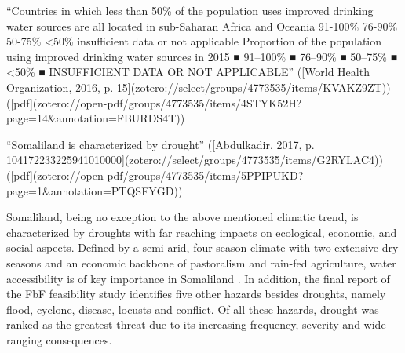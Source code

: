 “Countries in which less than 50\% of the population uses improved drinking water sources are all located in sub-Saharan Africa and Oceania 91-100\% 76-90\% 50-75\% <50\% insufficient data or not applicable Proportion of the population using improved drinking water sources in 2015 ■ 91–100\% ■ 76–90\% ■ 50–75\% ■ <50\% ■ INSUFFICIENT DATA OR NOT APPLICABLE” ([World Health Organization, 2016, p. 15](zotero://select/groups/4773535/items/KVAKZ9ZT)) ([pdf](zotero://open-pdf/groups/4773535/items/4STYK52H?page=14\&annotation=FBURDS4T))




“Somaliland is characterized by drought” ([Abdulkadir, 2017, p. 104172233225941010000](zotero://select/groups/4773535/items/G2RYLAC4)) ([pdf](zotero://open-pdf/groups/4773535/items/5PPIPUKD?page=1&annotation=PTQSFYGD))






Somaliland, being no exception to the above mentioned climatic trend, is characterized by droughts with far reaching impacts on ecological, economic, and social aspects. Defined by a semi-arid, four-season climate with two extensive dry seasons and an economic backbone of pastoralism and rain-fed agriculture, water accessibility is of key importance in Somaliland \autocite{abdulkadirAssessmentDroughtRecurrence2017,petrucciLandscapeLandformsNorthern2022,republicofsomalilandSomalilandCountryProfile2021}.
In addition, the final report of the FbF feasibility study identifies five other hazards besides droughts, namely flood, cyclone, disease, locusts and conflict. Of all these hazards, drought was ranked as the greatest threat due to its increasing frequency, severity and wide-ranging consequences.\newline

